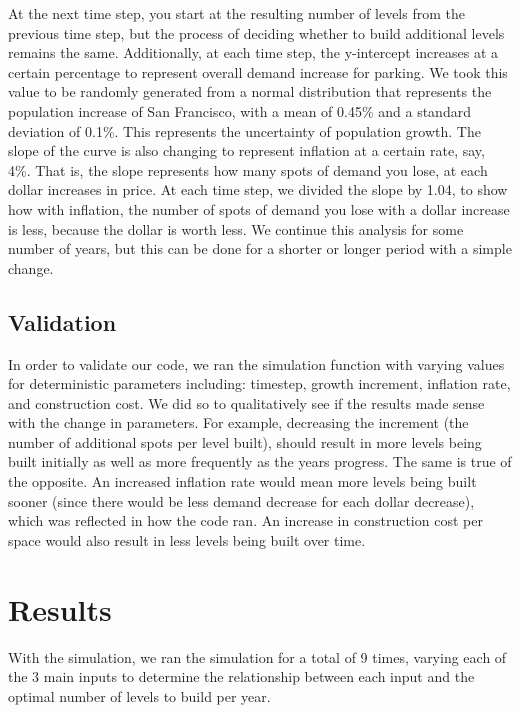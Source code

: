 \documentclass[
  letterpaper,
  DIV=11,
  numbers=noendperiod]{scrartcl}
\begin{document}
At the next time step, you start at the resulting number of levels from
the previous time step, but the process of deciding whether to build
additional levels remains the same. Additionally, at each time step, the
y-intercept increases at a certain percentage to represent overall
demand increase for parking. We took this value to be randomly generated
from a normal distribution that represents the population increase of
San Francisco, with a mean of 0.45\% and a standard deviation of 0.1\%.
This represents the uncertainty of population growth. The slope of the
curve is also changing to represent inflation at a certain rate, say,
4\%. That is, the slope represents how many spots of demand you lose, at
each dollar increases in price. At each time step, we divided the slope
by 1.04, to show how with inflation, the number of spots of demand you
lose with a dollar increase is less, because the dollar is worth less.
We continue this analysis for some number of years, but this can be done
for a shorter or longer period with a simple change.

\subsection{Validation}\label{validation}

In order to validate our code, we ran the simulation function with
varying values for deterministic parameters including: timestep, growth
increment, inflation rate, and construction cost. We did so to
qualitatively see if the results made sense with the change in
parameters. For example, decreasing the increment (the number of
additional spots per level built), should result in more levels being
built initially as well as more frequently as the years progress. The
same is true of the opposite. An increased inflation rate would mean
more levels being built sooner (since there would be less demand
decrease for each dollar decrease), which was reflected in how the code
ran. An increase in construction cost per space would also result in
less levels being built over time.

\section{Results}\label{results}

With the simulation, we ran the simulation for a total of 9 times,
varying each of the 3 main inputs to determine the relationship between
each input and the optimal number of levels to build per year.
\end{document}
